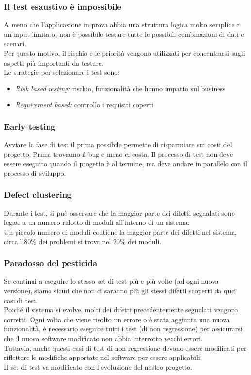 \documentclass[10pt, a4paper]{article}
\begin{document}
\subsubsection*{Il test esaustivo è impossibile}
A meno che l'applicazione in prova abbia una struttura logica molto semplice e
un input limitato, non è possibile testare tutte le possibili combinazioni di dati e
scenari.\\
Per questo motivo, il rischio e le priorità vengono utilizzati per concentrarsi
sugli aspetti più importanti da testare.\\
Le strategie per selezionare i test sono:
\begin{itemize}
    \item \textit{Risk based testing:} rischio, funzionalità che hanno impatto sul business
    \item \textit{Requirement based:} controllo i requisiti coperti
\end{itemize}

\subsubsection*{Early testing}
Avviare la fase di test il prima possibile permette di risparmiare sui costi del progetto. Prima troviamo il bug e meno ci costa. Il processo di test non deve essere eseguito quando il progetto è al termine, ma deve andare in parallelo con il processo di sviluppo.

\subsubsection*{Defect clustering}
Durante i test, si può osservare che la maggior parte dei difetti segnalati sono
legati a un numero ridotto di moduli all'interno di un sistema.\\
Un piccolo numero di moduli contiene la maggior parte dei difetti nel sistema, circa l'$80\%$ dei problemi si trova nel $20\%$ dei moduli.

\subsubsection*{Paradosso del pesticida}
Se continui a eseguire lo stesso set di test più e più volte (ad ogni nuova
versione), siamo sicuri che non ci saranno più gli stessi difetti scoperti da quei
casi di test.\\
Poiché il sistema si evolve, molti dei difetti precedentemente segnalati vengono
corretti. Ogni volta che viene risolto un errore o è stata aggiunta una nuova
funzionalità, è necessario eseguire tutti i test (di non regressione) per
assicurarsi che il nuovo software modificato non abbia interrotto vecchi errori.\\
Tuttavia, anche questi casi di test di non regressione devono essere modificati
per riflettere le modifiche apportate nel software per essere applicabili.\\
Il set di test va modificato con l'evoluzione del nostro progetto.
\end{document}
